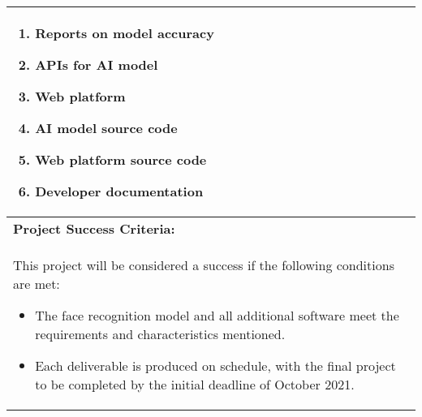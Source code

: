 \begin{longtable}{ | p{} l | }
{\begin{enumerate}
            \item Reports on model accuracy
            \item APIs for AI model
            \item Web platform
            \item AI model source code
            \item Web platform source code
            \item Developer documentation
        \end{enumerate}
    } \\
    \hline
    \multicolumn{2}{|l|}{\textbf{Project Success Criteria:}} \\
    \multicolumn{2}{|p{\textwidth}|}{This project will be considered a success if the following conditions are met:
        \begin{itemize}
            \item The face recognition model and all additional software meet the requirements and characteristics mentioned.
            \item Each deliverable is produced on schedule, with the final project to be completed by the initial deadline of October 2021.
        \end{itemize}
    } \\
    \hline
\end{longtable}
